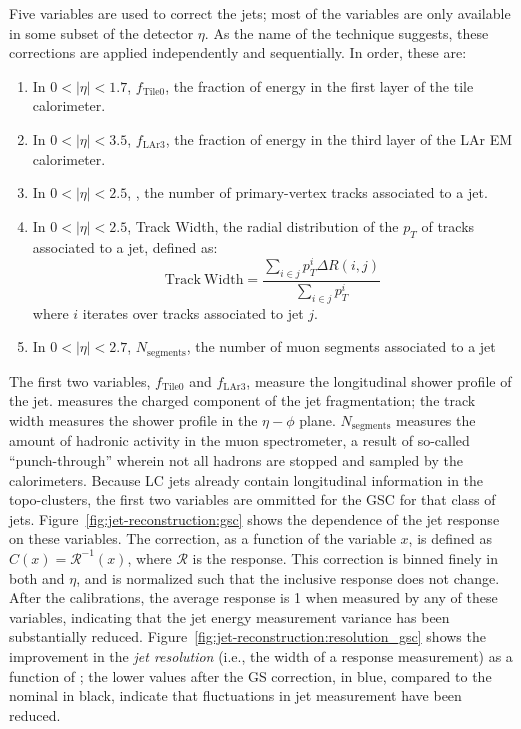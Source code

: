Five variables are used to correct the jets; most of the variables are only available in some subset of the detector $\eta$. As the name of the technique suggests, these corrections are applied independently and sequentially. In order, these are:

\begin{enumerate}
	\item In $0 < |\eta| < 1.7$, $f_{\mathrm{Tile0}}$, the fraction of energy in the first layer of the tile calorimeter.
	\item In $0 < |\eta| < 3.5$, $f_{\mathrm{LAr3}}$, the fraction of energy in the third layer of the LAr EM calorimeter.
	\item In $0 < |\eta| < 2.5$, \ntrk, the number of primary-vertex tracks associated to a jet.
	\item In $0 < |\eta| < 2.5$, Track Width, the radial distribution of the $p_T$ of tracks associated to a jet, defined as:
	\begin{equation}
	\mathrm{Track~Width} = \frac{\sum_{i \in j} p_T^{i} \Delta R(i,j) }{\sum_{i \in j} p_T^i}
	\end{equation}
	where $i$ iterates over tracks associated to jet $j$.
	\item In $0 < |\eta| < 2.7$, $N_\mathrm{segments}$, the number of muon segments associated to a jet
\end{enumerate}
The first two variables, $f_{\mathrm{Tile0}}$ and $f_{\mathrm{LAr3}}$, measure the longitudinal shower profile of the jet. \ntrk measures the charged component of the jet fragmentation; the track width measures the shower profile in the $\eta-\phi$ plane. $N_{\mathrm{segments}}$ measures the amount of hadronic activity in the muon spectrometer, a result of so-called ``punch-through'' wherein not all hadrons are stopped and sampled by the calorimeters. Because LC jets already contain longitudinal information in the topo-clusters, the first two variables are ommitted for the GSC for that class of jets. Figure~\ref{fig:jet-reconstruction:gsc} shows the dependence of the jet response on these variables. The correction, as a function of the variable $x$, is defined as $C(x) = \mathcal{R}^{-1}(x)$, where $\mathcal{R}$ is the \pt response. This correction is binned finely in both \pt and $\eta$, and is normalized such that the inclusive response does not change. After the calibrations, the average response is 1 when measured by any of these variables, indicating that the jet energy measurement variance has been substantially reduced. Figure~\ref{fig:jet-reconstruction:resolution_gsc} shows the improvement in the \textit{jet resolution} (i.e., the width of a response measurement) as a function of \pt; the lower values after the GS correction, in blue, compared to the nominal in black, indicate that fluctuations in jet measurement have been reduced.


